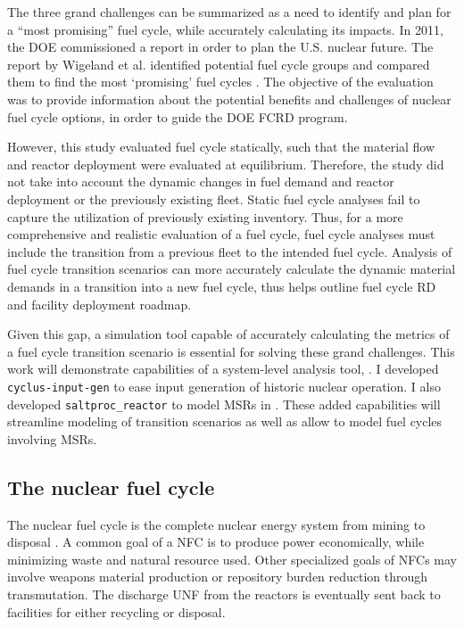 The three grand challenges can be summarized as a need to
identify and plan for a ``most promising'' fuel cycle, while
accurately calculating its impacts.
In 2011, the \gls{DOE} commissioned a report
in order to plan the U.S. nuclear future.
The report by Wigeland et al. identified potential fuel cycle groups and compared them
to find the most `promising' fuel cycles \cite{wigeland_nuclear_2014}.
The objective of the evaluation was to provide information about the
potential benefits and challenges of nuclear fuel cycle options, in order to
guide the \gls{DOE} \gls{FCRD} program.

However, this study evaluated fuel cycle statically, such that the
material flow and reactor deployment were evaluated at equilibrium.
Therefore, the study did not take into account the dynamic
changes in fuel demand and reactor deployment or the
previously existing fleet. Static fuel cycle analyses
fail to capture the utilization of previously existing inventory.
Thus, for a more comprehensive
and realistic
evaluation of a fuel cycle, fuel cycle analyses
must include the transition from a previous fleet to
the intended fuel cycle. Analysis of fuel
cycle transition scenarios
can more accurately calculate the dynamic material demands
in a transition into a new fuel cycle, thus helps outline
fuel cycle \gls{RD} and facility deployment roadmap.

Given this gap, a simulation tool capable of accurately
calculating the metrics of a fuel cycle transition scenario
is essential for solving these grand challenges. This work
will demonstrate capabilities of a system-level analysis
tool, \Cyclus. I developed \texttt{cyclus-input-gen} to
ease \Cyclus input generation of historic nuclear operation.
I also developed \texttt{saltproc\_reactor} to model
\glspl{MSR} in \Cyclus. These added capabilities will streamline
modeling of transition scenarios as well as allow
\Cyclus to model fuel cycles involving \glspl{MSR}.


\subsection{The nuclear fuel cycle}
The nuclear fuel cycle is the complete nuclear energy
system from mining to disposal \cite{tsoulfanidis_nuclear_2013}.
A common goal of
a \gls{NFC} is to produce power economically, while minimizing
waste and natural resource used. Other specialized goals of \gls{NFC}s may involve
weapons material production or repository burden reduction through transmutation.
The discharge \gls{UNF} from the reactors is eventually sent back to facilities for
either recycling or disposal.

